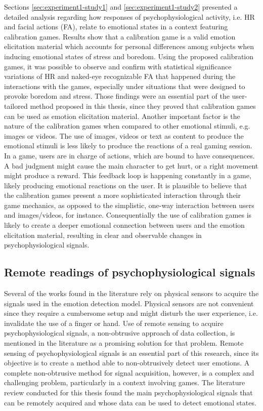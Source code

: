 Sections \ref{sec:experiment1-study1} and \ref{sec:experiment1-study2} presented a detailed analysis regarding how responses of psychophysiological activity, i.e. HR and facial actions (FA), relate to emotional states in a context featuring calibration games. Results show that a calibration game is a valid emotion elicitation material which accounts for personal differences among subjects when inducing emotional states of stress and boredom. Using the proposed calibration games, it was possible to observe and confirm with statistical significance variations of HR and naked-eye recognizable FA that happened during the interactions with the games, especially under situations that were designed to provoke boredom and stress. Those findings were an essential part of the user-tailored method proposed in this thesis, since they proved that calibration games can be used as emotion elicitation material. Another important factor is the nature of the calibration games when compared to other emotional stimuli, e.g. images or videos. The use of images, videos or text as content to produce the emotional stimuli is less likely to produce the reactions of a real gaming session. In a game, users are in charge of actions, which are bound to have consequences. A bad judgment might cause the main character to get hurt, or a right movement might produce a reward. This feedback loop is happening constantly in a game, likely producing emotional reactions on the user. It is plausible to believe that the calibration games present a more sophisticated interaction through their game mechanics, as opposed to the simplistic, one-way interaction between users and images/videos, for instance. Consequentially the use of calibration games is likely to create a deeper emotional connection between users and the emotion elicitation material, resulting in clear and observable changes in psychophysiological signals.

\subsection{Remote readings of psychophysiological signals}

Several of the works found in the literature rely on physical sensors to acquire the signals used in the emotion detection model. Physical sensors are not convenient since they require a cumbersome setup and might disturb the user experience, i.e. invalidate the use of a finger or hand. Use of remote sensing to acquire psychophysiological signals, a non-obtrusive approach of data collection, is mentioned in the literature as a promising solution for that problem. Remote sensing of psychophysiological signals is an essential part of this research, since its objective is to create a method able to non-obtrusively detect user emotions. A complete non-obtrusive method for signal acquisition, however, is a complex and challenging problem, particularly in a context involving games. The literature review conducted for this thesis found the main psychophysiological signals that can be remotely acquired and whose data can be used to detect emotional states.

